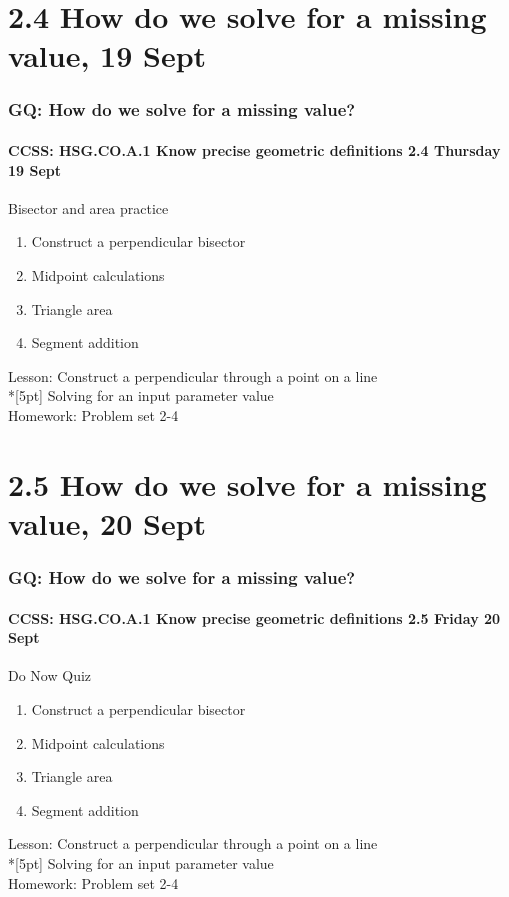 \documentclass{beamer}
\begin{document}
    \section{2.4 How do we solve for a missing value, 19 Sept}
    \frame
    {
      \frametitle{GQ: How do we solve for a missing value?}
      \framesubtitle{CCSS: HSG.CO.A.1 Know precise geometric definitions \hfill \alert{2.4 Thursday 19 Sept}}
  
      \begin{block}{Bisector and area practice}
      \begin{enumerate}
        \item Construct a perpendicular bisector
        \item Midpoint calculations
        \item Triangle area
        \item Segment addition
      \end{enumerate}
      \end{block}
      Lesson: Construct a perpendicular through a point on a line \\*[5pt]
      Solving for an input parameter value\\ \smallskip
      Homework: Problem set 2-4 
    }

    \section{2.5 How do we solve for a missing value, 20 Sept}
    \frame
    {
      \frametitle{GQ: How do we solve for a missing value?}
      \framesubtitle{CCSS: HSG.CO.A.1 Know precise geometric definitions \hfill \alert{2.5 Friday 20 Sept}}
  
      \begin{block}{Do Now Quiz}
      \begin{enumerate}
        \item Construct a perpendicular bisector
        \item Midpoint calculations
        \item Triangle area
        \item Segment addition
      \end{enumerate}
      \end{block}
      Lesson: Construct a perpendicular through a point on a line \\*[5pt]
      Solving for an input parameter value\\ \smallskip
      Homework: Problem set 2-4 
    }
\end{document}
